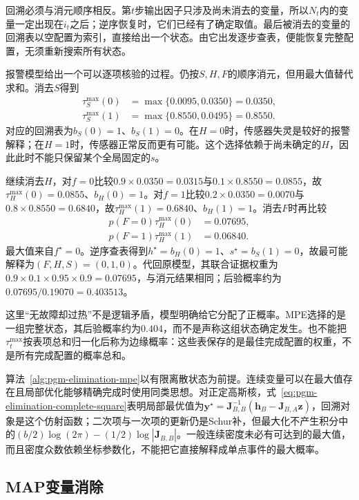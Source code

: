 回溯必须与消元顺序相反。第$t$步输出因子只涉及尚未消去的变量，所以$N_t$内的变量一定出现在$i_t$之后；逆序恢复时，它们已经有了确定取值。最后被消去的变量的回溯表以空配置为索引，直接给出一个状态。由它出发逐步查表，便能恢复完整配置，无须重新搜索所有状态。

报警模型给出一个可以逐项核验的过程。仍按$S,H,F$的顺序消元，但用最大值替代求和。消去$S$得到
\[
  \begin{aligned}
    \tau_S^{\max}(0)&=\max\{0.0095,0.0350\}=0.0350,\\
    \tau_S^{\max}(1)&=\max\{0.8550,0.0495\}=0.8550.
  \end{aligned}
\]
对应的回溯表为$b_S(0)=1$、$b_S(1)=0$。在$H=0$时，传感器失灵是较好的报警解释；在$H=1$时，传感器正常反而更有可能。这个选择依赖于尚未确定的$H$，因此此时不能只保留某个全局固定的$s$。

继续消去$H$，对$f=0$比较$0.9\times0.0350=0.0315$与$0.1\times0.8550=0.0855$，故$\tau_H^{\max}(0)=0.0855$、$b_H(0)=1$。对$f=1$比较$0.2\times0.0350=0.0070$与$0.8\times0.8550=0.6840$，故$\tau_H^{\max}(1)=0.6840$、$b_H(1)=1$。消去$F$时再比较
\[
  \begin{aligned}
    p(F=0)\tau_H^{\max}(0)&=0.07695,\\
    p(F=1)\tau_H^{\max}(1)&=0.06840.
  \end{aligned}
\]
最大值来自$f^\star=0$。逆序查表得到$h^\star=b_H(0)=1$、$s^\star=b_S(1)=0$，故最可能解释为$(F,H,S)=(0,1,0)$。代回原模型，其联合证据权重为$0.9\times0.1\times0.95\times0.9=0.07695$，与消元结果相同；后验概率约为$0.07695/0.19070=0.403513$。

这里“无故障却过热”不是逻辑矛盾，模型明确给它分配了正概率。MPE选择的是一组完整状态，其后验概率约为$0.404$，而不是声称这组状态确定发生。也不能把$\tau_t^{\max}$按表项总和归一化后称为边缘概率：这些表保存的是最佳完成配置的权重，不是所有完成配置的概率总和。

算法~\ref{alg:pgm-elimination-mpe}以有限离散状态为前提。连续变量可以在最大值存在且局部优化能够精确完成时使用同类思想。对正定高斯核，式~\eqref{eq:pgm-elimination-complete-square}表明局部最优值为$\bm{y}^\star=\bm{J}_{B,B}^{-1}(\bm{h}_B-\bm{J}_{B,A}\bm{z})$，回溯对象是这个仿射函数；二次项与一次项的更新仍是Schur补，但最大化不产生积分中的$(b/2)\log(2\pi)-(1/2)\log|\bm{J}_{B,B}|$。一般连续密度未必有可达到的最大值，而且密度众数依赖坐标参数化，不能把它直接解释成单点事件的最大概率。

\subsection{MAP变量消除}
\label{sec:pgm-elimination-map}

